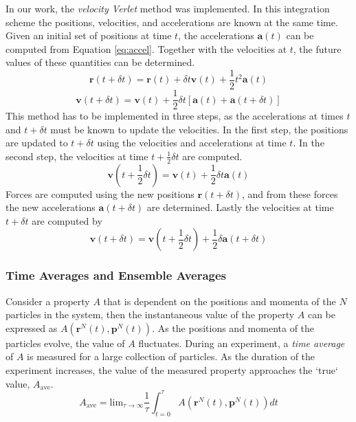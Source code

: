 In our work, the \textit{velocity Verlet} method was implemented. In
this integration scheme the positions, velocities, and accelerations
are known at the same time. Given an initial set of positions at time
$t$, the accelerations $\mathbf{a}(t)$ can be computed from Equation
\eqref{eq:accel}. Together with the velocities at $t$, the future
values of these quantities can be determined.
\begin{equation}\label{eq:vv-r}
\mathbf{r}(t+\delta t) = \mathbf{r}(t) + \delta t \mathbf{v}(t) +
\frac{1}{2}t^2\mathbf{a}(t)
\end{equation}
\begin{equation}\label{eq:vv-v}
\mathbf{v}(t+ \delta t) = \mathbf{v}(t) + \frac{1}{2}\delta
t[\mathbf{a}(t) + \mathbf{a}(t + \delta t)]
\end{equation}
This method has to be implemented in three steps, as the accelerations
at times $t$ and $t + \delta t$ must be known to update the
velocities. In the first step, the positions are updated to
$t + \delta t$ using the velocities and accelerations at time $t$. In
the second step, the velocities at time $t + \frac{1}{2} \delta t$ are
computed.
\begin{equation}\label{eq:vv-v2}
\mathbf{v}(t+\frac{1}{2}\delta t) = \mathbf{v}(t) + \frac{1}{2}\delta t
\mathbf{a}(t)
\end{equation}
Forces are computed using the new positions $\mathbf{r}(t + \delta
t)$, and from these forces the new accelerations $\mathbf{a}(t +
\delta t)$ are determined. Lastly the velocities at time $t + \delta
t$ are computed by
\begin{equation}\label{eq:vv-v3}
\mathbf{v}(t+\delta t) = \mathbf{v}(t+\frac{1}{2}\delta t) +
\frac{1}{2}\delta \mathbf{a}(t + \delta t)
\end{equation}


\subsubsection{Time Averages and Ensemble Averages}
Consider a property $A$ that is dependent on the positions and momenta
of the $N$ particles in the system, then the instantaneous value of
the property $A$ can be expressed as
$A(\mathbf{r}^N(t),\mathbf{p}^N(t))$. As the positions and momenta of
the particles evolve, the value of $A$ fluctuates. During an
experiment, a \textit{time average} of $A$ is measured for a large
collection of particles. As the duration of the experiment increases,
the value of the measured property approaches the `true` value,
$A_{\mathrm{ave}}$.
\begin{equation}\label{eq:A-ave}
A_{\mathrm{ave}} = \mathrm{lim}_{\tau \to \infty} \frac{1}{\tau} \int_{t=0}^{\tau}
A(\mathbf{r}^N(t),\mathbf{p}^N(t))dt
\end{equation}

